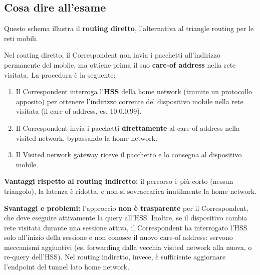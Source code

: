 \documentclass[
  italian,
  openany]{book}
\providecommand{\tightlist}{%
  \setlength{\itemsep}{0pt}\setlength{\parskip}{0pt}}
\begin{document}
\subsection{Cosa dire all'esame}\label{cosa-dire-allesame-4}

Questo schema illustra il \textbf{routing diretto}, l'alternativa al
triangle routing per le reti mobili.

Nel routing diretto, il Correspondent non invia i pacchetti
all'indirizzo permanente del mobile, ma ottiene prima il suo
\textbf{care-of address} nella rete visitata. La procedura è la
seguente:

\begin{enumerate}
\def\labelenumi{\arabic{enumi}.}
\tightlist
\item
  Il Correspondent interroga l'\textbf{HSS} della home network (tramite
  un protocollo apposito) per ottenere l'indirizzo corrente del
  dispositivo mobile nella rete visitata (il care-of address, es.
  10.0.0.99).
\item
  Il Correspondent invia i pacchetti \textbf{direttamente} al care-of
  address nella visited network, bypassando la home network.
\item
  Il Visited network gateway riceve il pacchetto e lo consegna al
  dispositivo mobile.
\end{enumerate}

\textbf{Vantaggi rispetto al routing indiretto:} il percorso è più corto
(nessun triangolo), la latenza è ridotta, e non si sovraccarica
inutilmente la home network.

\textbf{Svantaggi e problemi:} l'approccio \textbf{non è trasparente}
per il Correspondent, che deve eseguire attivamente la query all'HSS.
Inoltre, se il dispositivo cambia rete visitata durante una sessione
attiva, il Correspondent ha interrogato l'HSS solo all'inizio della
sessione e non conosce il nuovo care-of address: servono meccanismi
aggiuntivi (es. forwarding dalla vecchia visited network alla nuova, o
re-query dell'HSS). Nel routing indiretto, invece, è sufficiente
aggiornare l'endpoint del tunnel lato home network.
\end{document}
